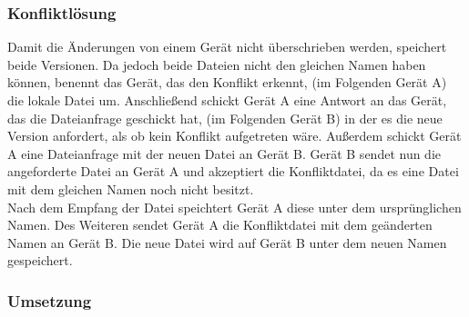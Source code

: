 \subsubsection{Konfliktlösung}
Damit die Änderungen von einem Gerät nicht überschrieben werden, speichert \sblit beide Versionen. Da jedoch beide Dateien nicht den gleichen Namen haben können, benennt das Gerät, das den Konflikt erkennt, (im Folgenden Gerät A) die lokale Datei um. Anschließend schickt Gerät A eine Antwort an das Gerät, das die Dateianfrage geschickt hat,  (im Folgenden Gerät B) in der es die neue Version anfordert, als ob kein Konflikt aufgetreten wäre. Außerdem schickt Gerät A eine Dateianfrage mit der neuen Datei an Gerät B. Gerät B sendet nun die angeforderte Datei an Gerät A und akzeptiert die Konfliktdatei, da es eine Datei mit dem gleichen Namen noch nicht besitzt. \\
Nach dem Empfang der Datei speichtert Gerät A diese unter dem ursprünglichen Namen. Des Weiteren sendet Gerät A die Konfliktdatei mit dem geänderten Namen an Gerät B. Die neue Datei wird auf Gerät B unter dem neuen Namen gespeichert.

\subsubsection{Umsetzung}

